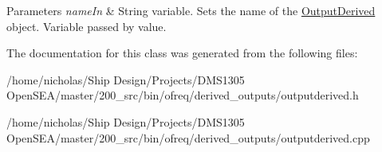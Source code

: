 \begin{DoxyParams}{Parameters}
{\em name\-In} & String variable. Sets the name of the \hyperlink{class_output_derived}{Output\-Derived} object. Variable passed by value. \\
\hline
\end{DoxyParams}


The documentation for this class was generated from the following files\-:\begin{DoxyCompactItemize}
\item 
/home/nicholas/\-Ship Design/\-Projects/\-D\-M\-S1305 Open\-S\-E\-A/master/200\-\_\-src/bin/ofreq/derived\-\_\-outputs/outputderived.\-h\item 
/home/nicholas/\-Ship Design/\-Projects/\-D\-M\-S1305 Open\-S\-E\-A/master/200\-\_\-src/bin/ofreq/derived\-\_\-outputs/outputderived.\-cpp\end{DoxyCompactItemize}
